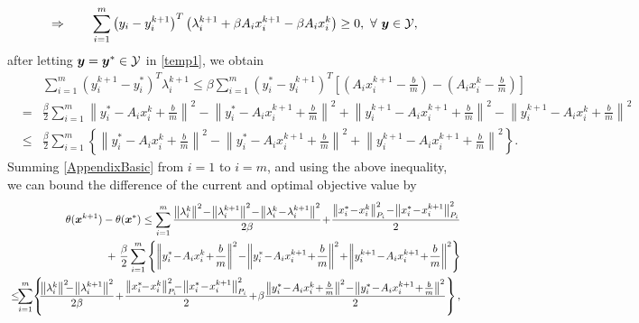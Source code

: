 \documentclass{mcom-l}
\theoremstyle{definition}
\theoremstyle{remark}
\numberwithin{equation}{section}
\begin{document}
\begin{equation}\label{temp1}
\Rightarrow\qquad \sum_{i=1}^m \left( y_i - y_i^{k+1} \right)^T \left( \lambda_i^{k+1} + \beta A_i x_i^{k+1} - \beta A_i x_i^k \right) \ge 0,\ \forall\ {{\mbox{\boldmath $y$}}}\in {\mathcal{Y}},
\end{equation}
after letting ${{\mbox{\boldmath $y$}}} = {{\mbox{\boldmath $y$}}}^*\in {\mathcal{Y}}$ in \eqref{temp1}, we obtain
{\footnotesize\begin{eqnarray}
&&\sum_{i=1}^m \left( y_i^{k+1} - y_i^* \right)^T \lambda_i^{k+1} \le \beta \sum_{i=1}^m \left( y_i^* - y_i^{k+1} \right)^T \left[ \left( A_i x_i^{k+1} - \frac{b}{m}\right)  - \left( A_i x_i^k - \frac{b}{m}\right) \right]\nonumber\\
\!\!\!\!&=&\!\!\!\! \frac{\beta}{2} \sum_{i=1}^m \left\| y_i^* \!-\! A_i x_i^k \!+\! \frac{b}{m} \right\|^2 \!-\! \left\| y_i^* \!-\! A_i x_i^{k+1} \!+\! \frac{b}{m} \right\|^2 \!+\! \left\| y_i^{k+1} \!-\! A_i x_i^{k+1} \!+\! \frac{b}{m} \right\|^2 \!-\! \left\| y_i^{k+1} \!-\! A_i x_i^k \!+\! \frac{b}{m} \right\|^2\nonumber\\
\!\!\!\!&\le&\!\!\!\! \frac{\beta}{2} \sum_{i=1}^m \left\{ \left\| y_i^* \!-\! A_i x_i^k \!+\! \frac{b}{m} \right\|^2 \!-\! \left\| y_i^* \!-\! A_i x_i^{k+1} \!+\! \frac{b}{m} \right\|^2 \!+\! \left\| y_i^{k+1} \!-\! A_i x_i^{k+1} \!+\! \frac{b}{m} \right\|^2\right\}.\nonumber
\end{eqnarray}}
Summing \eqref{AppendixBasic} from $i = 1$ to $i = m$, and using the above inequality, we can bound the difference of the current and optimal objective value by
{\footnotesize\begin{eqnarray}
&&\theta({{\mbox{\boldmath $x$}}}^{k+1}) - \theta({{\mbox{\boldmath $x$}}}^*)\le \sum_{i=1}^m \frac{\left\|\lambda_i^k\right\|^2 \!-\! \left\| \lambda_i^{k+1} \right\|^2 \!-\! \left\| \lambda_i^k \!-\! \lambda_i^{k+1} \right\|^2}{2\beta} \!+\! \frac{\left\|x_i^* \!-\! x_i^k \right\|_{P_i}^2 \!-\! \left\| x_i^* \!-\! x_i^{k+1} \right\|_{P_i}^2}{2}\nonumber\\
&&\qquad +\  \frac{\beta}{2} \sum_{i=1}^m \left\{ \left\| y_i^* \!-\! A_i x_i^k \!+\! \frac{b}{m} \right\|^2 \!-\! \left\| y_i^* \!-\! A_i x_i^{k+1} \!+\! \frac{b}{m} \right\|^2 \!+\! \left\| y_i^{k+1} \!-\! A_i x_i^{k+1} \!+\! \frac{b}{m} \right\|^2\right\}\nonumber\\
&\le&\!\!\!\!\!\!\! \sum_{i=1}^m\! \left\{\!\! \frac{\left\|\lambda_i^k\right\|^2 \!\!\!-\! \left\| \lambda_i^{k+1} \right\|^2}{2\beta} \!+\! \frac{\left\|x_i^* \!\!-\! x_i^k \right\|_{P_i}^2 \!\!\!-\! \left\| x_i^* \!-\! x_i^{k+1} \right\|_{P_i}^2}{2} \!+\! \beta\frac{\left\| y_i^* \!-\! A_i x_i^k \!+\! \frac{b}{m} \right\|^2 \!-\! \left\| y_i^* \!-\! A_i x_i^{k+1} \!+\! \frac{b}{m} \right\|^2}{2} \right\},\nonumber
\end{eqnarray}}
\end{document}
